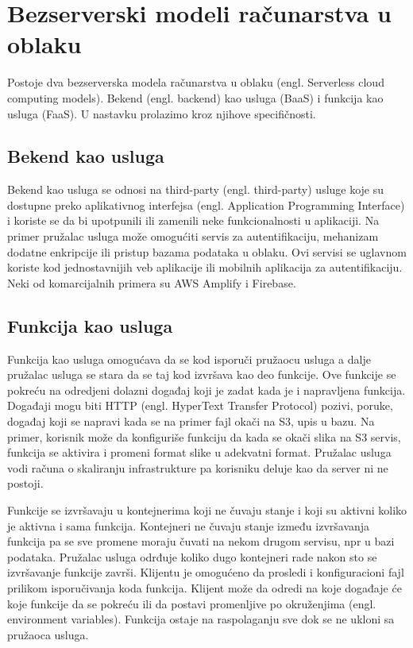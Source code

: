 \documentclass[12pt,oneside]{memoir}
\begin{document}
\section{Bezserverski modeli računarstva u oblaku}
Postoje dva bezserverska modela računarstva u oblaku (engl. Serverless cloud computing models). Bekend (engl. backend) kao usluga (BaaS) i funkcija kao usluga (FaaS). U nastavku prolazimo kroz njihove specifičnosti.

\subsection{Bekend kao usluga}

Bekend kao usluga se odnosi na third-party (engl. third-party) usluge koje su dostupne preko aplikativnog interfejsa (engl. Application Programming Interface) i koriste se da bi upotpunili ili zamenili neke funkcionalnosti u aplikaciji. Na primer pružalac usluga može omogućiti servis za autentifikaciju, mehanizam dodatne enkripcije ili pristup bazama podataka u oblaku. Ovi servisi se uglavnom koriste kod jednostavnijih veb aplikacije ili mobilnih aplikacija za autentifikaciju\cite{wis}\cite{bsa}. Neki od komarcijalnih primera su AWS Amplify i Firebase\cite{baasp}.

\subsection{Funkcija kao usluga}
Funkcija kao usluga omogućava da se kod isporuči pružaocu usluga a dalje pružalac usluga se stara da se taj kod izvršava kao deo funkcije. Ove funkcije se pokreću na odredjeni dolazni događaj koji je zadat kada je i napravljena funkcija. Događaji mogu biti HTTP (engl. HyperText Transfer Protocol) pozivi, poruke, događaj koji se napravi kada se na primer fajl okači na S3, upis u bazu. Na primer, korisnik može da konfiguriše funkciju da kada se okači slika na S3 servis, funkcija se aktivira i promeni format slike u adekvatni format. Pružalac usluga vodi računa o skaliranju infrastrukture pa korisniku deluje kao da server ni ne postoji. 

Funkcije se izvršavaju u kontejnerima koji ne čuvaju stanje i koji su aktivni koliko je aktivna i sama funkcija. Kontejneri ne čuvaju stanje između izvršavanja funkcija pa se sve promene moraju čuvati na nekom drugom servisu, npr u bazi podataka. Pružalac usluga odrđuje koliko dugo kontejneri rade nakon sto se izvršavanje funkcije završi. Klijentu je omogućeno da prosledi i konfiguracioni fajl prilikom isporučivanja koda funkcija. Klijent može da odredi na koje događaje će koje funkcije da se pokreću ili da postavi promenljive po okruženjima (engl. environment variables). Funkcija ostaje na raspolaganju sve dok se ne ukloni sa pružaoca usluga\cite{bsa}.
\end{document}
